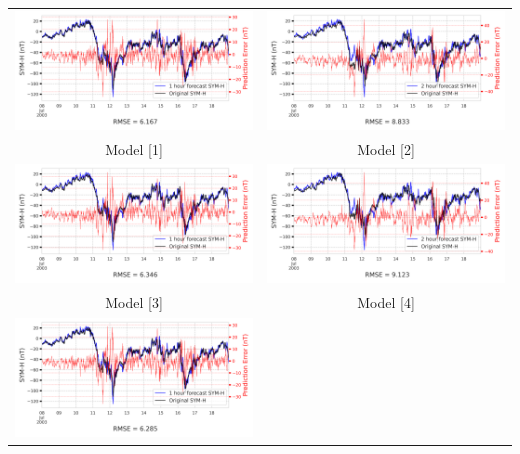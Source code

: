\documentclass[draft,sw]{agutexSI2019}
\begin{document}
\begin{table}
\centering
\begin{tabular}{cc}
\includegraphics[width=0.49\linewidth]{paper_plots/1h_swics/1h_swics_storm_35.png}
&
\includegraphics[width=0.49\linewidth]{paper_plots/2h_swics/2h_swics_storm_35.png}
\\
Model [1] & Model [2]
\vspace*{12pt}
\\
\includegraphics[width=0.49\linewidth]{paper_plots/1h_no_swics/1h_no_swics_storm_35.png}
&
\includegraphics[width=0.49\linewidth]{paper_plots/2h_no_swics/2h_no_swics_storm_35.png}
\\
Model [3] & Model [4]
\vspace*{12pt}
\\
\includegraphics[width=0.49\linewidth]{paper_plots/1h_swics_model_on_no_swics/1h_swics_model_on_no_swics_storm_35.png}

\end{tabular}
\end{table}
\end{document}

